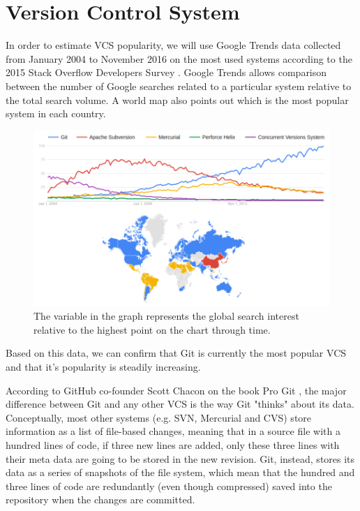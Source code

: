 \section{Version Control System} \label{sec:git}

In order to estimate VCS popularity, we will use Google Trends data collected from January 2004 to November 2016 on the most used systems according to the 2015 Stack Overflow Developers Survey \cite{ref:stackoverflow}. Google Trends allows comparison between the number of Google searches related to a particular system relative to the total search volume. A world map also points out which is the most popular system in each country.

\begin{figure}[H]
	\centering
	\includegraphics[width=\textwidth]{figures/vcs_pop.png}
	\caption{The variable in the graph represents the global search interest relative to the highest point on the chart through time.}
	\label{fig:vcs_pop}
\end{figure}

Based on this data, we can confirm that Git is currently the most popular VCS and that it's popularity is steadily increasing.

According to GitHub co-founder Scott Chacon on the book Pro Git \cite{ref:progit}, the major difference between Git and any other VCS is the way Git "thinks" about its data. Conceptually, most other systems (e.g. SVN, Mercurial and CVS) store information as a list of file-based changes, meaning that in a source file with a hundred lines of code, if three new lines are added, only these three lines with their meta data are going to be stored in the new revision. Git, instead, stores its data as a series of snapshots of the file system, which mean that the hundred and three lines of code are redundantly (even though compressed) saved into the repository when the changes are committed.

